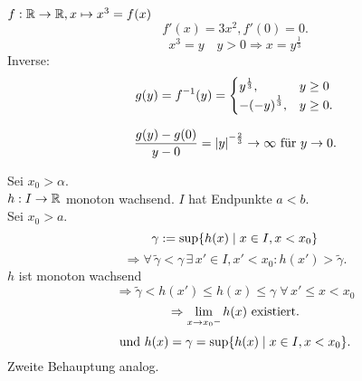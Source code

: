 \documentclass[../ana1.tex]{subfiles}
\begin{document}
\begin{bsp}
    \( f: \mathbb{R} \rightarrow \mathbb{R}, x \mapsto x^3 = f(x) \)
    \[ f'(x) = 3 x^2, f'(0) = 0. \]
    \[ x^3 = y \quad y > 0 \Rightarrow x = y^\frac{1}{3} \]
    Inverse: 
    \[ g(y) = \inverse{f}(y) = \begin{cases}
        y^\frac{1}{3}, &y \geq 0\\
        -{(-y)}^{\frac{1}{3}}, &y \geq 0.
    \end{cases} \]

    \begin{center}
    \end{center}
    \[ \frac{ g(y) - g(0) }{ y - 0 } 
    = \abs{y}^{\minus \frac{2}{3}} \rightarrow \infty 
    \text{ für } y \rightarrow 0. \]
\end{bsp}
\begin{bew}
    Sei \( x_0 > \alpha \).\\
    \( h : I \rightarrow \mathbb{R} \) monoton wachsend. 
    \( I \) hat Endpunkte \( a < b \).\\
    Sei \( x_0 > a \). 
    \[ \gamma := \sup \{ h(x) \;\vert \; x \in I, x < x_0 \} \]
    \[ \Rightarrow \forall \, \tilde{\gamma} < \gamma 
    \,\exists \, x' \in I, x' < x_0 : h(x') > \tilde{\gamma}. \]
    \( h \) ist monoton wachsend 
    \[ \Rightarrow \tilde{\gamma} < h(x') \leq h(x) \leq \gamma 
    \;\forall \, x' \leq x < x_0 \]
    \[ \Rightarrow \limesx{x}{x_0 \minus} h(x) \text{ existiert.} \]
    \[ \text{und } h(x) = \gamma 
    = \sup \{ h(x) \;\vert \; x \in I, x < x_0 \}. \]
    Zweite Behauptung analog.
\end{bew}
\end{document}
